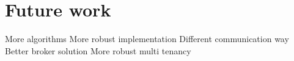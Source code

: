 \chapter{Future work}
More algorithms
More robust implementation
Different communication way
Better broker solution
More robust multi tenancy
